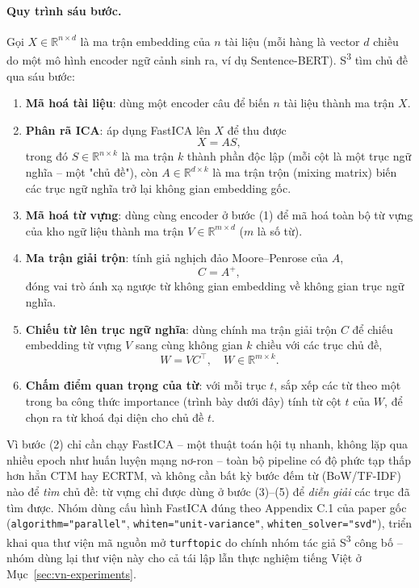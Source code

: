 \documentclass[11pt]{article}
\begin{document}
\paragraph{Quy trình sáu bước.} Gọi $X \in \mathbb{R}^{n \times d}$ là ma
trận embedding của $n$ tài liệu (mỗi hàng là vector $d$ chiều do một mô hình
encoder ngữ cảnh sinh ra, ví dụ Sentence-BERT). S\textsuperscript{3} tìm chủ
đề qua sáu bước:
\begin{enumerate}
    \item[(1)] \textbf{Mã hoá tài liệu}: dùng một encoder câu để biến $n$
    tài liệu thành ma trận $X$.
    \item[(2)] \textbf{Phân rã ICA}: áp dụng FastICA lên $X$ để thu được
    \begin{equation}
        X = A S,
        \label{eq:generative}
    \end{equation}
    trong đó $S \in \mathbb{R}^{n \times k}$ là ma trận $k$ thành phần độc
    lập (mỗi cột là một trục ngữ nghĩa -- một "chủ đề"), còn
    $A \in \mathbb{R}^{d \times k}$ là ma trận trộn (mixing matrix) biến các
    trục ngữ nghĩa trở lại không gian embedding gốc.
    \item[(3)] \textbf{Mã hoá từ vựng}: dùng cùng encoder ở bước (1) để mã
    hoá toàn bộ từ vựng của kho ngữ liệu thành ma trận
    $V \in \mathbb{R}^{m \times d}$ ($m$ là số từ).
    \item[(4)] \textbf{Ma trận giải trộn}: tính giả nghịch đảo
    Moore--Penrose của $A$,
    \begin{equation}
        C = A^{+},
        \label{eq:unmixing}
    \end{equation}
    đóng vai trò ánh xạ ngược từ không gian embedding về không gian trục
    ngữ nghĩa.
    \item[(5)] \textbf{Chiếu từ lên trục ngữ nghĩa}: dùng chính ma trận giải
    trộn $C$ để chiếu embedding từ vựng $V$ sang cùng không gian $k$ chiều
    với các trục chủ đề,
    \begin{equation}
        W = V C^{\top}, \quad W \in \mathbb{R}^{m \times k}.
        \label{eq:projection}
    \end{equation}
    \item[(6)] \textbf{Chấm điểm quan trọng của từ}: với mỗi trục $t$, sắp
    xếp các từ theo một trong ba công thức importance (trình bày dưới đây)
    tính từ cột $t$ của $W$, để chọn ra từ khoá đại diện cho chủ đề $t$.
\end{enumerate}
Vì bước (2) chỉ cần chạy FastICA -- một thuật toán hội tụ nhanh, không lặp
qua nhiều epoch như huấn luyện mạng nơ-ron -- toàn bộ pipeline có độ phức
tạp thấp hơn hẳn CTM hay ECRTM, và không cần bất kỳ bước đếm từ (BoW/TF-IDF)
nào để \emph{tìm} chủ đề: từ vựng chỉ được dùng ở bước (3)--(5) để
\emph{diễn giải} các trục đã tìm được. Nhóm dùng cấu hình FastICA đúng theo
Appendix C.1 của paper gốc (\texttt{algorithm="parallel"},
\texttt{whiten="unit-variance"}, \texttt{whiten\_solver="svd"}), triển khai
qua thư viện mã nguồn mở \texttt{turftopic} do chính nhóm tác giả
S\textsuperscript{3} công bố -- nhóm dùng lại thư viện này cho cả tái lập
lẫn thực nghiệm tiếng Việt ở Mục~\ref{sec:vn-experiments}.
\end{document}
